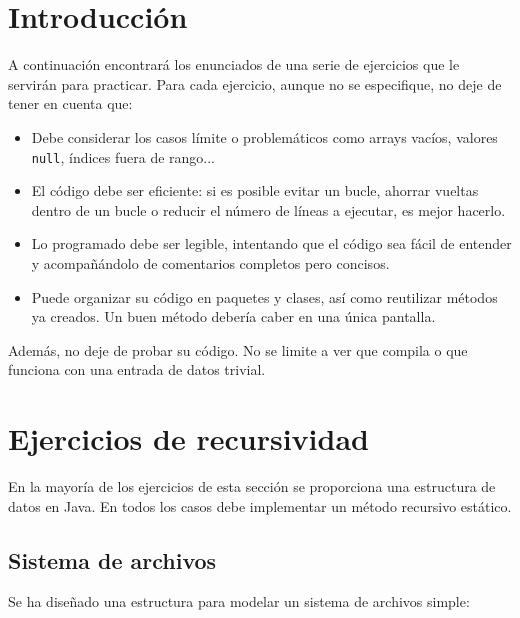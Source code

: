\documentclass[a4paper]{article}
\newcommand{\code}[1]{\texttt{#1}}
\begin{document}


\section{Introducción}

A continuación encontrará los enunciados de una serie de ejercicios que le servirán para practicar. Para cada ejercicio, aunque no se especifique, no deje de tener en cuenta que:

\begin{itemize}
    \item Debe considerar los casos límite o problemáticos como arrays vacíos, valores \code{null}, índices fuera de rango...
    \item El código debe ser eficiente: si es posible evitar un bucle, ahorrar vueltas dentro de un bucle o reducir el número de líneas a ejecutar, es mejor hacerlo.
    \item Lo programado debe ser legible, intentando que el código sea fácil de entender y acompañándolo de comentarios completos pero concisos.
    \item Puede organizar su código en paquetes y clases, así como reutilizar métodos ya creados. Un buen método debería caber en una única pantalla.
\end{itemize}

Además, no deje de probar su código. No se limite a ver que compila o que funciona con una entrada de datos trivial.

\section{Ejercicios de recursividad}

En la mayoría de los ejercicios de esta sección se proporciona una estructura de datos en Java. En todos los casos debe implementar un método recursivo estático.

\subsection{Sistema de archivos}
\label{arbolNArio}

Se ha diseñado una estructura para modelar un sistema de archivos simple:
\end{document}
